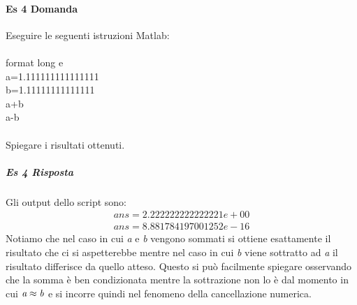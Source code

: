 \documentclass[a4paper]{report}
\begin{document}
\paragraph{Es 4 Domanda}
Eseguire le seguenti istruzioni Matlab:\\
\\format long e\\a=1.111111111111111\\b=1.11111111111111\\a+b\\a-b\\\\Spiegare i risultati ottenuti.
\subparagraph{Es 4 Risposta}
Gli output dello script sono:\\
\[
\begin{aligned}
ans = 2.222222222222221e+00\\
ans = 8.881784197001252e-16
\end{aligned}
\]
Notiamo che nel caso in cui \emph{a} e \emph{b} vengono sommati si ottiene esattamente il risultato che ci si aspetterebbe mentre nel caso in cui \emph{b} viene sottratto ad \emph{a} il risultato differisce da quello atteso.
Questo si può facilmente spiegare  osservando che la somma è ben condizionata mentre la sottrazione non lo è dal momento in cui $\emph{a}\approx\emph{b}$ e si incorre quindi nel fenomeno della cancellazione numerica.
\\
\end{document}
